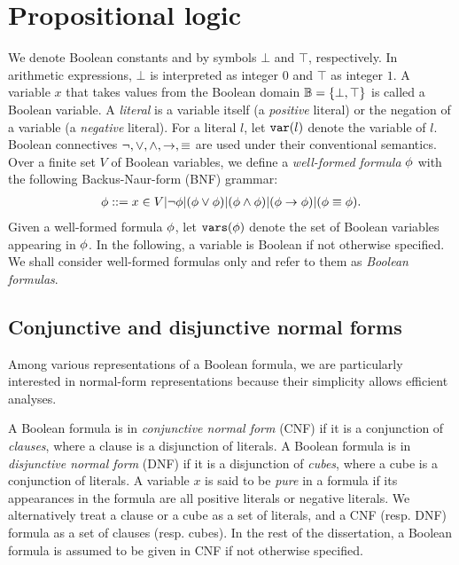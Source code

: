 \section{Propositional logic}
\label{sect:background-propositional-logic}

We denote Boolean constants \false and \true by symbols $\bot$ and $\top$, respectively.
In arithmetic expressions, $\bot$ is interpreted as integer $0$ and $\top$ as integer $1$.
A variable $x$ that takes values from the Boolean domain $\mathbb{B}=\{\bot,\top\}$ is called a Boolean variable.
A \textit{literal} is a variable itself (a \textit{positive} literal) or the negation of a variable (a \textit{negative} literal).
For a literal $l$, let $\texttt{var}(l)$ denote the variable of $l$.
Boolean connectives $\lnot, \lor, \land, \rightarrow, \equiv$ are used under their conventional semantics.
Over a finite set $V$ of Boolean variables,
we define a \textit{well-formed formula} $\phi$ with the following Backus-Naur-form (BNF) grammar:
\begin{align}
    \phi ::= x\in V | \lnot\phi | (\phi\lor\phi) | (\phi\land\phi) | (\phi\rightarrow\phi) | (\phi\equiv\phi).
\end{align}
Given a well-formed formula $\phi$, let $\texttt{vars}(\phi)$ denote the set of Boolean variables appearing in $\phi$.
In the following, a variable is Boolean if not otherwise specified.
We shall consider well-formed formulas only and refer to them as \textit{Boolean formulas}.

\subsection{Conjunctive and disjunctive normal forms}
Among various representations of a Boolean formula,
we are particularly interested in normal-form representations because their simplicity allows efficient analyses.

A Boolean formula is in \textit{conjunctive normal form} (CNF) if it is a conjunction of \textit{clauses},
where a clause is a disjunction of literals.
A Boolean formula is in \textit{disjunctive normal form} (DNF) if it is a disjunction of \textit{cubes},
where a cube is a conjunction of literals.
A variable $x$ is said to be \textit{pure} in a formula if its appearances in the formula are all positive literals or negative literals.
We alternatively treat a clause or a cube as a set of literals,
and a CNF (resp. DNF) formula as a set of clauses (resp. cubes).
In the rest of the dissertation, a Boolean formula is assumed to be given in CNF if not otherwise specified.


